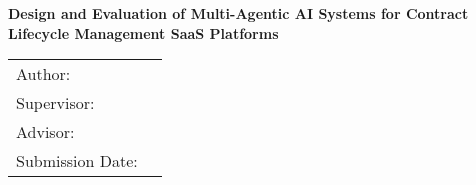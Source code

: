 \begin{titlepage}
  \centering


  \vspace{5mm}
  {\huge\MakeUppercase{\getFaculty{}}}\\

  \vspace{5mm}
  {\large\MakeUppercase{\getUniversity{}}}\\

  \vspace{20mm}
  {\Large \getDoctype{}}

  \vspace{15mm}
  {\huge\bfseries \getTitle{} \par}

  \vspace{10mm}
  {\Large\bfseries Design and Evaluation of Multi-Agentic AI Systems for Contract Lifecycle Management SaaS Platforms \par}

  \vspace{15mm}
  \begin{tabular}{l l}
    Author:          & \getAuthor{} \\
    Supervisor:      & \getSupervisor{} \\
    Advisor:         & \getAdvisor{} \\
    Submission Date: & \getSubmissionDate{} \\
  \end{tabular}

\end{titlepage}
